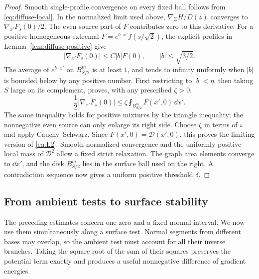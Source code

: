 \begin{proof}
Smooth single-profile convergence on every fixed ball follows from
\eqref{eq:diffuse-local}.  In the normalized limit used above,
$\nabla_\Sigma H/D(z)$ converges to $\nabla_{x'}F_s(0)/2$.
The even source part of $F$ contributes zero to this derivative.
For a positive homogeneous extremal
$F=e^{b\cdot x'}f(s/\sqrt2)$, the explicit profiles in
Lemma~\ref{lem:diffuse-positive} give
\[
 |\nabla_{x'}F_s(0)|\le C|b|F(0),\qquad |b|\le\sqrt{3/2}.
\]
The average of $e^{b\cdot x'}$ on $B_{S/2}^m$ is at least $1$,
and tends to infinity uniformly when $|b|$ is bounded below by any
positive number.  First restricting to $|b|<\eta$, then taking $S$
large on its complement, proves, with any prescribed $\zeta>0$,
\[
 \frac12|\nabla_{x'}F_s(0)|
 \le \zeta\fint_{B_{S/2}^m}F(x',0)\,\dd x'.
\]
The same inequality holds for positive mixtures by the triangle
inequality; the nonnegative even source can only enlarge its right
side.  Choose $\zeta$ in terms of $\varepsilon$ and apply Cauchy--Schwarz.
Since $F(x',0)=\mathcal D(x',0)$, this proves the limiting version
of \eqref{eq:L2}.  Smooth normalized convergence and the uniformly
positive local mass of $\mathcal D^2$ allow a fixed strict relaxation.
The graph area elements converge to $\dd x'$, and the disk
$B_{S/2}^m$ lies in the surface ball used on the right.  A contradiction
sequence now gives a uniform positive threshold $\delta$.
\end{proof}

\subsection{From ambient tests to surface stability}

The preceding estimates concern one zero and a fixed normal interval.
We now use them simultaneously along a surface test.  Normal segments
from different bases may overlap, so the ambient test must account for
all their inverse branches.  Taking the square root of the sum of their
squares preserves the potential term exactly and produces a useful
nonnegative difference of gradient energies.

